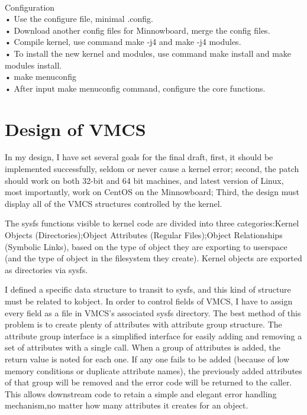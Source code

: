 \documentclass[10pt,draftclsnofoot,peerreview,letterpaper,onecolumn,]{IEEEtran}
\begin{document}
~\\Configuration
~\\• Use the configure file, minimal .config.
~\\• Download another config files for Minnowboard, merge the config files.
~\\• Compile kernel, use command make -j4 and make -j4 modules.
~\\• To install the new kernel and modules, use command make install and make modules install.
~\\• make menuconfig
~\\• After input make menuconfig command, configure the core functions.

\section{Design of VMCS}
In my design, I have set several goals for the final draft, first, it should be implemented successfully, seldom or never cause a kernel error; second, the patch should work on both 32-bit and 64 bit machines, and latest version of Linux, most importantly, work on CentOS on the Minnowboard; Third, the design must display all of the VMCS structures controlled by the kernel.

The sysfs functions visible to kernel code are divided into three categories:Kernel Objects (Directories);Object Attributes (Regular Files);Object Relationships (Symbolic Links), based on the type of object they are exporting to userspace (and the type of object in the filesystem they create). Kernel objects are exported as directories via sysfs.

I defined a specific data structure to transit to sysfs, and this kind of structure must be related to kobject. In order to control fields of VMCS, I have to assign every field as a file in VMCS’s associated sysfs directory. The best method of this problem is to create plenty of attributes with attribute group structure. The attribute group interface is a simplified interface for easily adding and removing a set of attributes with a single call. When a group of attributes is added, the return value is noted for each one. If any one fails to be added (because of low memory conditions or duplicate attribute names), the previously added attributes of that group will be removed and the error code will be returned to the caller. This allows downstream code to retain a simple and elegant error handling mechanism,no matter how many attributes it creates for an object.
\end{document}
